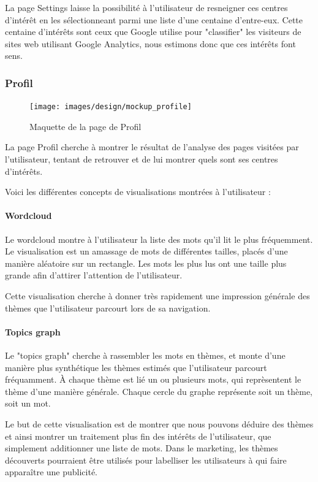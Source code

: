 			La page Settings laisse la possibilité à l'utilisateur de resneigner ces centres d'intérêt en les sélectionneant parmi une liste d'une centaine d'entre-eux. Cette centaine d'intérêts sont ceux que Google utilise pour "classifier" les visiteurs de sites web utilisant Google Analytics, nous estimons donc que ces intérêts font sens. 

		\subsubsection{Profil}

			\begin{figure}[!h]
				\centering
				\texttt{[image: images/design/mockup\_profile]}
				\caption{Maquette de la page de Profil}
				\label{d-mockup-profile}
			\end{figure}

			La page Profil cherche à montrer le résultat de l'analyse des pages visitées par l'utilisateur, tentant de retrouver et de lui montrer quels sont ses centres d'intérêts. 

			Voici les différentes concepts de visualisations montrées à l'utilisateur :

			\paragraph{Wordcloud}

				Le wordcloud montre à l'utilisateur la liste des mots qu'il lit le plus fréquemment. Le visualisation est un amassage de mots de différentes tailles, placés d'une manière aléatoire sur un rectangle. Les mots les plus lus ont une taille plus grande afin d'attirer l'attention de l'utilisateur.

				Cette visualisation cherche à donner très rapidement une impression générale des thèmes que l'utilisateur parcourt lors de sa navigation.

			\paragraph{Topics graph}

				Le "topics graph" cherche à rassembler les mots en thèmes, et monte d'une manière plus synthétique les thèmes estimés que l'utilisateur parcourt fréquamment. À chaque thème est lié un ou plusieurs mots, qui reprèsentent le thème d'une manière générale. Chaque cercle du graphe représente soit un thème, soit un mot.

				Le but de cette visualisation est de montrer que nous pouvons déduire des thèmes et ainsi montrer un traitement plus fin des intérêts de l'utilisateur, que simplement additionner une liste de mots. Dans le marketing, les thèmes découverts pourraient être utilisés pour labelliser les utilisateurs à qui faire apparaître une publicité.

